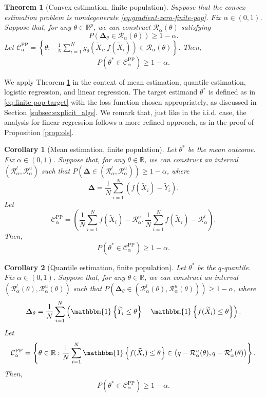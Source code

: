 \documentclass[10pt]{article}
\newtheorem{theorem}{Theorem}
\newtheorem{cor}{Corollary} %
\def\R{\mathbb{R}}
\newcommand{\ind}[1]{\mathbbm{1}\left\{#1\right\}}
\newcommand{\cR}{\mathcal{R}}
\newcommand{\Xt}{\widetilde{X}}
\newcommand{\Yt}{\widetilde{Y}}
\newcommand{\rec}{\mathbf{\Delta}}
\newcommand{\CPP}{\mathcal{C}^{\mathrm{PP}}}
\begin{document}
\begin{theorem}[Convex estimation, finite population]
\label{thm:convex-finite-pop}
Suppose that the convex estimation problem is nondegenerate \eqref{eq:gradient-zero-finite-pop}. Fix $\alpha\in(0,1)$.
Suppose that, for any $\theta\in\R^p$, we can construct $\cR_\alpha(\theta)$ satisfying
$$P\left(\rec_{\theta} \in \cR_{\alpha}(\theta) \right) \geq 1-\alpha.$$
Let $\CPP_\alpha = \left\{\theta : -\frac{1}{N}\sum_{i=1}^N g_\theta(\Xt_i,f(\Xt_i)) \in \cR_\alpha(\theta) \right\}$. Then,
\begin{equation}
    P( \theta^* \in \CPP_\alpha ) \geq 1-\alpha.
\end{equation}
\end{theorem}

We apply Theorem \ref{thm:convex-finite-pop} in the context of mean estimation, quantile estimation, logistic regression, and linear regression. The target estimand $\theta^*$ is defined as in \eqref{eq:finite-pop-target} with the loss function chosen appropriately, as discussed in Section \ref{subsec:explicit_algs}. We remark that, just like in the i.i.d. case, the analysis for linear regression follows a more refined approach, as in the proof of Proposition \ref{prop:ols}.

\begin{cor}[Mean estimation, finite population]
\label{cor:mean-cor-finite-pop}
    Let $\theta^*$ be the mean outcome. Fix $\alpha\in(0,1)$. Suppose that, for any $\theta\in\R$, we can construct an interval $(\cR_\alpha^l, \cR_\alpha^u)$ such that
    $P\left(\rec \in (\cR_\alpha^l, \cR_\alpha^u) \right)\geq 1-\alpha$,
    where
    $$\rec = \frac 1 N \sum_{i=1}^N \left(f(\Xt_i) -\Yt_i \right).$$
    Let
    $$\CPP_\alpha = \left(\frac{1}{N} \sum_{i=1}^N f(\Xt_i) - \cR_\alpha^u, \frac{1}{N} \sum_{i=1}^N f(\Xt_i)  - \cR_\alpha^l \right).$$
    Then,
    $$P\left(\theta^* \in \CPP_{\alpha}\right) \geq 1-\alpha.$$
\end{cor}

\begin{cor}[Quantile estimation, finite population]
\label{cor:quantile_cor-finite-pop}
    Let $\theta^*$ be the $q$-quantile. Fix $\alpha\in(0,1)$. Suppose that, for any $\theta\in\R$, we can construct an interval $(\cR_\alpha^l(\theta), \cR_\alpha^u(\theta))$ such that
    $P\left(\rec_{\theta} \in (\cR_\alpha^l(\theta), \cR_\alpha^u(\theta)) \right)\geq 1-\alpha$,
    where
    $$\rec_{\theta} = \frac 1 N \sum_{i=1}^N \left(\ind{\Yt_i \leq \theta} - \ind{f(\Xt_i) \leq \theta}\right).$$
    Let
    $$\CPP_\alpha = \left\{\theta\in\R:\frac{1}{N} \sum_{i=1}^N \ind{f(\Xt_i) \leq \theta}\in \left(q - \cR_\alpha^u(\theta), q - \cR_\alpha^l(\theta) \right) \right\}.$$
    Then,
    $$P\left(\theta^* \in \CPP_{\alpha}\right) \geq 1-\alpha.$$
\end{cor}
\end{document}
